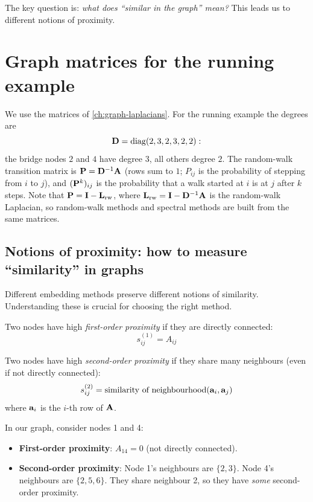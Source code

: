 \begin{notechapter}
The key question is: \emph{what does ``similar in the graph'' mean?} This leads us to different notions of proximity.

\section{Graph matrices for the running example}

We use the matrices of \cref{ch:graph-laplacians}. For the running example the degrees are
\[
\mathbf{D} = \operatorname{diag}(2, 3, 2, 3, 2, 2):
\]
the bridge nodes $2$ and $4$ have degree $3$, all others degree $2$. The random-walk transition matrix is $\mathbf{P} = \mathbf{D}^{-1}\mathbf{A}$ (rows sum to $1$; $P_{ij}$ is the probability of stepping from $i$ to $j$), and $(\mathbf{P}^k)_{ij}$ is the probability that a walk started at $i$ is at $j$ after $k$ steps. Note that $\mathbf{P} = \mathbf{I} - \mathbf{L}_{\text{rw}}$, where $\mathbf{L}_{\text{rw}} = \mathbf{I} - \mathbf{D}^{-1}\mathbf{A}$ is the random-walk Laplacian, so random-walk methods and spectral methods are built from the same matrices.

\subsection{Notions of proximity: how to measure ``similarity'' in graphs}

Different embedding methods preserve different notions of similarity. Understanding these is crucial for choosing the right method.

\begin{definition}
Two nodes have high \emph{first-order proximity} if they are directly connected:
\[
s^{(1)}_{ij} = A_{ij}
\]
\end{definition}

\begin{definition}
Two nodes have high \emph{second-order proximity} if they share many neighbours (even if not directly connected):
\[
s^{(2)}_{ij} = \text{similarity of neighbourhood}(\mathbf{a}_i, \mathbf{a}_j)
\]
where $\mathbf{a}_i$ is the $i$-th row of $\mathbf{A}$.
\end{definition}

\begin{example}
In our graph, consider nodes 1 and 4:
\begin{itemize}
    \item \textbf{First-order proximity}: $A_{14} = 0$ (not directly connected).
    \item \textbf{Second-order proximity}: Node 1's neighbours are $\{2, 3\}$. Node 4's neighbours are $\{2, 5, 6\}$. They share neighbour 2, so they have \emph{some} second-order proximity.
\end{itemize}


\end{example}
\end{notechapter}
